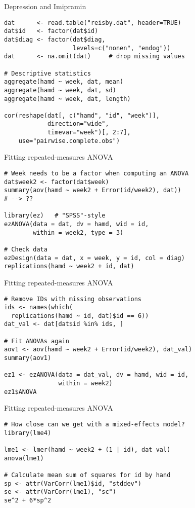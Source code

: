 \documentclass{beamer}
\begin{document}
{

\begin{frame}[fragile]{Depression and Imipramin}
  \begin{lstlisting}
dat      <- read.table("reisby.dat", header=TRUE)
dat$id   <- factor(dat$id)
dat$diag <- factor(dat$diag, 
                   levels=c("nonen", "endog"))
dat      <- na.omit(dat)     # drop missing values

# Descriptive statistics
aggregate(hamd ~ week, dat, mean)
aggregate(hamd ~ week, dat, sd)
aggregate(hamd ~ week, dat, length)

cor(reshape(dat[, c("hamd", "id", "week")], 
            direction="wide",
            timevar="week")[, 2:7],
    use="pairwise.complete.obs")
  \end{lstlisting}
\end{frame}

\begin{frame}[fragile]{Fitting repeated-measures ANOVA}
  \begin{lstlisting}
# Week needs to be a factor when computing an ANOVA
dat$week2 <- factor(dat$week)
summary(aov(hamd ~ week2 + Error(id/week2), dat))
# --> ?? 

library(ez)   # "SPSS"-style
ezANOVA(data = dat, dv = hamd, wid = id,
        within = week2, type = 3)

# Check data
ezDesign(data = dat, x = week, y = id, col = diag)
replications(hamd ~ week2 + id, dat)
  \end{lstlisting}
\end{frame}

\begin{frame}[fragile]{Fitting repeated-measures ANOVA}
  \begin{lstlisting}
# Remove IDs with missing observations
ids <- names(which(
  replications(hamd ~ id, dat)$id == 6))
dat_val <- dat[dat$id %in% ids, ]

# Fit ANOVAs again
aov1 <- aov(hamd ~ week2 + Error(id/week2), dat_val)
summary(aov1)

ez1 <- ezANOVA(data = dat_val, dv = hamd, wid = id,
               within = week2)
ez1$ANOVA
  \end{lstlisting}
\end{frame}

\begin{frame}[fragile]{Fitting repeated-measures ANOVA}
  \begin{lstlisting}
# How close can we get with a mixed-effects model?
library(lme4)

lme1 <- lmer(hamd ~ week2 + (1 | id), dat_val)
anova(lme1)

# Calculate mean sum of squares for id by hand
sp <- attr(VarCorr(lme1)$id, "stddev")
se <- attr(VarCorr(lme1), "sc")
se^2 + 6*sp^2
  \end{lstlisting}
\end{frame}

}
\end{document}
